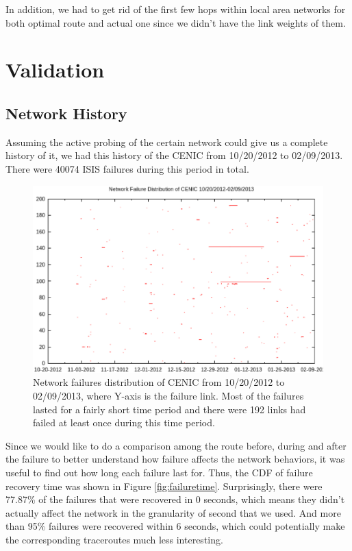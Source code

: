 \documentclass[conference, twocolumn, oneside, 10pt]{IEEEtran}
\begin{document}
In addition, we had to get rid of the first few hops within local area networks for both optimal route and actual one since we didn't have the link weights of them.

\section{Validation}
\label{sec:sec5}

\subsection{Network History}

Assuming the active probing of the certain network could give us a complete history of it, we had this history of the CENIC from 10/20/2012 to 02/09/2013. There were 40074 ISIS failures during this period in total.

\begin{figure}[h!]
\centering
\includegraphics[scale=0.4]{plot/failure_plot.eps}
\caption{Network failures distribution of CENIC from 10/20/2012 to 02/09/2013, where Y-axis is the failure link. Most of the failures lasted for a fairly short time period and there were 192 links had failed at least once during this time period.}
\label{fig:failureplot}
\end{figure}

Since we would like to do a comparison among the route before, during and after the failure to better understand how failure affects the network behaviors, it was useful to find out how long each failure last for. Thus, the CDF of failure recovery time was shown in Figure \ref{fig:failuretime}. Surprisingly, there were 77.87\% of the failures that were recovered in 0 seconds, which means they didn't actually affect the network in the granularity of second that we used. And more than 95\% failures were recovered within 6 seconds, which could potentially make the corresponding traceroutes much less interesting. 
\end{document}
